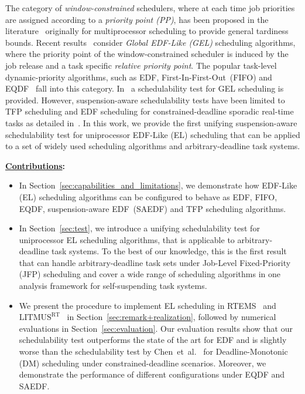 \documentclass[conference]{IEEEtran}
\theoremstyle{definition}
\theoremstyle{remark}
\begin{document}
	The category of \emph{window-constrained} schedulers, where at each time job priorities are assigned according to a \emph{priority point (PP)}, has been proposed in the literature~\cite{DBLP:conf/rtss/LeontyevA07} originally for multiprocessor scheduling to provide general tardiness bounds.
	Recent results~\cite{DBLP:conf/ecrts/EricksonA12} consider \emph{Global EDF-Like (GEL)} scheduling algorithms, where the priority point of the window-constrained scheduler is induced by the job release and a task specific \emph{relative priority point}.
	The popular task-level dynamic-priority algorithms, such as EDF, First-In-First-Out~(FIFO) and EQDF~\cite{DBLP:conf/rtas/BackCS12} fall into this category.
	In~\cite{DBLP:conf/rtss/LeontyevCA09} a schedulability test for GEL scheduling is provided.
	However, suspension-aware schedulability tests have been
    limited to TFP scheduling and EDF
    scheduling for constrained-deadline sporadic real-time tasks as
    detailed in~\cite{suspension-review-jj}.
    In this work, we provide the first
    unifying suspension-aware schedulability test for uniprocessor EDF-Like (EL) scheduling that
    can be applied to a set of widely used scheduling algorithms and
    arbitrary-deadline task systems. 
  
	\noindent\textbf{\underline{Contributions}:} %
	\begin{itemize}
    \item In Section~\ref{sec:capabilities_and_limitations}, we demonstrate how EDF-Like (EL) scheduling algorithms can
    be configured to behave as EDF, FIFO, EQDF,
    suspension-aware EDF~(SAEDF) and TFP scheduling algorithms.
    \item In Section~\ref{sec:test}, we introduce a unifying schedulability test for uniprocessor EL
      scheduling algorithms, that is applicable to
      arbitrary-deadline task systems. To the best of our knowledge,
      this is the first result that can handle arbitrary-deadline task
      sets under Job-Level Fixed-Priority (JFP) scheduling and cover a wide range of scheduling algorithms in one
      analysis framework for self-suspending task
      systems. 
    \item We present the procedure to implement EL scheduling in
      RTEMS~\cite{rtems} and
      {$\text{LITMUS}^{\text{RT}}$}~\cite{litmusrt} in
      Section~\ref{sec:remark+realization}, followed by numerical
      evaluations in Section~\ref{sec:evaluation}.
      Our evaluation
      results show that our schedulability test outperforms the state
      of the art for EDF and is slightly worse than the schedulability
      test by Chen~et~al.~\cite{ChenECRTS2016-suspension} for
      Deadline-Monotonic (DM) scheduling under constrained-deadline
      scenarios.  Moreover, we demonstrate the performance of
      different configurations under EQDF and SAEDF.
	\end{itemize}
\end{document}
